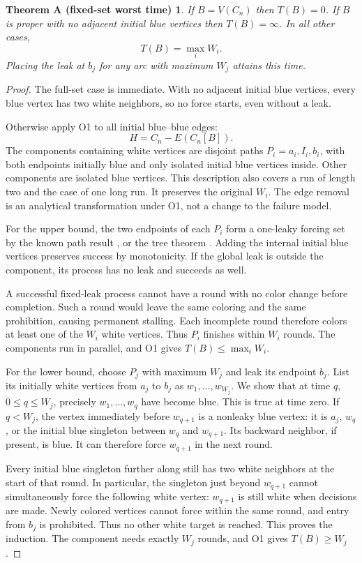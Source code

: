 \documentclass[11pt,a4paper]{article}
\newtheorem*{theoremA}{Theorem A (fixed-set worst time)}
\begin{document}
\begin{theoremA}
If $B=V(C_n)$ then $T(B)=0$. If $B$ is proper with no adjacent initial blue
vertices then $T(B)=\infty$. In all other cases,
\begin{equation}
 T(B)=\max_i W_i. \tag{A}\label{eq:A}
\end{equation}
Placing the leak at $b_j$ for any arc with maximum $W_j$ attains this time.
\end{theoremA}
\begin{proof}
The full-set case is immediate. With no adjacent initial blue vertices,
every blue vertex has two white neighbors, so no force starts, even without
a leak.

Otherwise apply O1 to all initial blue--blue edges:
\[
 H=C_n-E(C_n[B]).
\]
The components containing white vertices are disjoint paths
$P_i=a_i,I_i,b_i$, with both endpoints initially blue and only isolated
initial blue vertices inside. Other components are isolated blue vertices.
This description also covers a run of length two and the case of one long
run. It preserves the original $W_i$. The edge removal is an analytical
transformation under O1, not a change to the failure model.

For the upper bound, the two endpoints of each $P_i$ form a one-leaky forcing
set by the known path result \cite[Proposition 3.1]{ADK2024}, or the tree
theorem \cite[Theorem 4.4]{AKWY2022}. Adding the internal initial blue
vertices preserves success by monotonicity. If the global leak is outside
the component, its process has no leak and succeeds as well.

A successful fixed-leak process cannot have a round with no color change
before completion. Such a round would leave the same coloring and the same
prohibition, causing permanent stalling. Each incomplete round therefore
colors at least one of the $W_i$ white vertices. Thus $P_i$ finishes within
$W_i$ rounds. The components run in parallel, and O1 gives
$T(B)\leq\max_i W_i$.

For the lower bound, choose $P_j$ with maximum $W_j$ and leak its endpoint
$b_j$. List its initially white vertices from $a_j$ to $b_j$ as
$w_1,\ldots,w_{W_j}$. We show that at time $q$, $0\leq q\leq W_j$,
precisely $w_1,\ldots,w_q$ have become blue. This is true at time zero.
If $q<W_j$, the vertex immediately before $w_{q+1}$ is a nonleaky blue
vertex: it is $a_j$, $w_q$, or the initial blue singleton between $w_q$ and
$w_{q+1}$. Its backward neighbor, if present, is blue. It can therefore
force $w_{q+1}$ in the next round.

Every initial blue singleton further along still has two white neighbors
at the start of that round. In particular, the singleton just beyond
$w_{q+1}$ cannot simultaneously force the following white vertex: $w_{q+1}$
is still white when decisions are made. Newly colored vertices cannot force
within the same round, and entry from $b_j$ is prohibited. Thus no other
white target is reached. This proves the induction. The component needs
exactly $W_j$ rounds, and O1 gives $T(B)\geq W_j$.
\end{proof}
\end{document}
